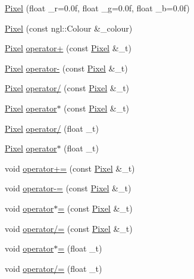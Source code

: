 \begin{DoxyCompactItemize}
\item 
\hyperlink{structImage_1_1Pixel_a93d339cf79d059bfff19312344dc3169}{Pixel} (float \+\_\+r=0.\+0f, float \+\_\+g=0.\+0f, float \+\_\+b=0.\+0f)
\item 
\hyperlink{structImage_1_1Pixel_abc76a3238962d4fa4088df895345e70d}{Pixel} (const ngl\+::\+Colour \&\+\_\+colour)
\item 
\hyperlink{structImage_1_1Pixel}{Pixel} \hyperlink{structImage_1_1Pixel_a162bce995aeeaba97b86787bf3ec564c}{operator+} (const \hyperlink{structImage_1_1Pixel}{Pixel} \&\+\_\+t)
\item 
\hyperlink{structImage_1_1Pixel}{Pixel} \hyperlink{structImage_1_1Pixel_a45cdd002e2736b87f6ecfc21a936af67}{operator-\/} (const \hyperlink{structImage_1_1Pixel}{Pixel} \&\+\_\+t)
\item 
\hyperlink{structImage_1_1Pixel}{Pixel} \hyperlink{structImage_1_1Pixel_a7650bff7855c16b62836969e3a6b51b8}{operator/} (const \hyperlink{structImage_1_1Pixel}{Pixel} \&\+\_\+t)
\item 
\hyperlink{structImage_1_1Pixel}{Pixel} \hyperlink{structImage_1_1Pixel_a45019e2e7a6b136c483dda3757073376}{operator$\ast$} (const \hyperlink{structImage_1_1Pixel}{Pixel} \&\+\_\+t)
\item 
\hyperlink{structImage_1_1Pixel}{Pixel} \hyperlink{structImage_1_1Pixel_ac12af52c4bb346e6f43f32d8620af758}{operator/} (float \+\_\+t)
\item 
\hyperlink{structImage_1_1Pixel}{Pixel} \hyperlink{structImage_1_1Pixel_a9ac59bc7ffcf0d258020457f7a874c5e}{operator$\ast$} (float \+\_\+t)
\item 
void \hyperlink{structImage_1_1Pixel_a98be5e814ed4f7c02c2511069be37358}{operator+=} (const \hyperlink{structImage_1_1Pixel}{Pixel} \&\+\_\+t)
\item 
void \hyperlink{structImage_1_1Pixel_a4e55c878fdded95922790c951512e97b}{operator-\/=} (const \hyperlink{structImage_1_1Pixel}{Pixel} \&\+\_\+t)
\item 
void \hyperlink{structImage_1_1Pixel_a5b971c342ea48a8e37cea11b9ebd86e1}{operator$\ast$=} (const \hyperlink{structImage_1_1Pixel}{Pixel} \&\+\_\+t)
\item 
void \hyperlink{structImage_1_1Pixel_a0f4bed70eac895d786db9b8235c6efce}{operator/=} (const \hyperlink{structImage_1_1Pixel}{Pixel} \&\+\_\+t)
\item 
void \hyperlink{structImage_1_1Pixel_ace1d119e142e767536947e16b0e058a2}{operator$\ast$=} (float \+\_\+t)
\item 
void \hyperlink{structImage_1_1Pixel_a1e33173e685768745e612706e7090b79}{operator/=} (float \+\_\+t)
\end{DoxyCompactItemize}
